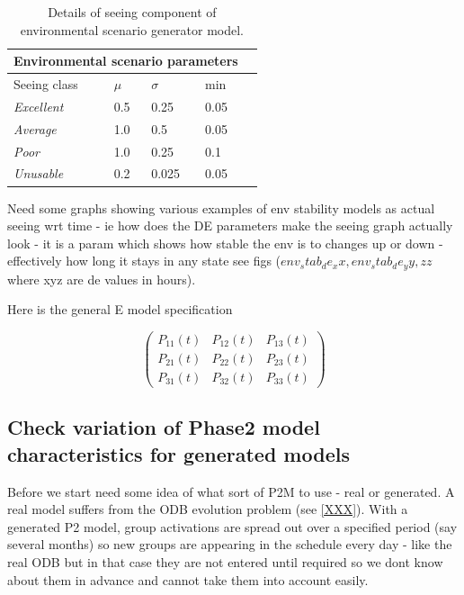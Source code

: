 \begin{table}[h]
 \label{tab:ltc_env_scenario}
 \begin{center}
  \begin{tabular}{lllll}
   \toprule
   \multicolumn{4}{c}{Environmental scenario parameters} \\
   \midrule
   Seeing class & $\mu$ & $\sigma$ & min \\
   \midrule
   \emph{Excellent} & 0.5 & 0.25  & 0.05 \\
   \emph{Average}   & 1.0 & 0.5   & 0.05 \\
   \emph{Poor}      & 1.0 & 0.25  & 0.1 \\
   \emph{Unusable}  & 0.2 & 0.025 & 0.05 \\
   \bottomrule
  \end{tabular}
 \end{center}
\caption{Details of seeing component of environmental scenario generator model.} 
\end{table}


Need some graphs showing various examples of env stability models as actual seeing wrt time - ie how does the DE parameters make the seeing graph actually look - it is a param which shows how stable the env is to changes up or down - effectively how long it stays in any state see figs ($env_stab_de_xx, env_stab_de_yy, zz$ where xyz are de values in hours).

Here is the general E model specification

\[ \left( 
\begin{array}{ccc}
  P_{11}(t) & P_{12}(t) & P_{13}(t) \\
  P_{21}(t) & P_{22}(t) & P_{23}(t) \\
  P_{31}(t) & P_{32}(t) & P_{33}(t) 
\end{array} 
\right)\] 

\subsection{Check variation of Phase2 model characteristics for generated models}

Before we start need some idea of what sort of P2M to use - real or generated. A real model suffers from the ODB evolution problem (see \ref{XXX}). With a generated P2 model, group activations are spread out over a specified period (say several months) so new groups are appearing in the schedule every day - like the real ODB but in that case they are not entered until required so we dont know about them in advance and cannot take them into account easily.
   
